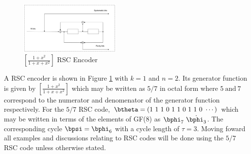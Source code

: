 \begin{figure}[h]
\centering
		\includegraphics[width=0.45\textwidth]{./PaperSources/RSCExample3.pdf}
		\caption{$[\frac{1+x^2}{1+x+x^2}]$  RSC Encoder}
		\label{fig1}
		\end{figure}
		
A RSC encoder is shown in Figure \ref{fig1} with $k=1$ and $n=2$. Its generator function is given by $[\frac{1+x^2}{1+x+x^2}]$ which may be written as $5/7$ in octal form where $5 ~ \text{and} ~ 7$ correspond to the numerator and denomenator of the generator function respectively. 
 For the $5/7$ RSC code, $\btheta=(1~1~1~ 0~ 1~ 1~ 0~ 1~ 1~ 0~\cdots)$ which may be written in terms of the elements of GF(8) as $\bphi_7~\dot{\bphi_3}$. The corresponding cycle $\bpsi=\bphi_6 $ with a cycle length of $\tau =3$. 
 Moving foward all examples and discussions relating to RSC codes will be done using the $5/7$ RSC code unless otherwise stated.
